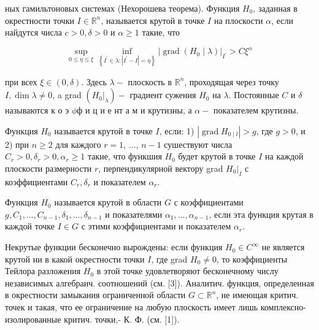 \documentclass[10pt]{article}
\begin{document}
ных гамильтоновых системах (Нехорошева теорема). Функция $H_{0}$, заданная в окрестности точки $I \in \mathbb{R}^{n}$, называется крутой в точке $I$ на плоскости $\alpha$, если найдутся числа $c>0, \delta>0$ и $\alpha \geqslant 1$ такие, что



\[

\sup _{0 \leqslant \eta \leqslant \xi} \inf _{\left\{I^{\prime} \in \lambda:\left|I^{\prime}-I\right|=\eta\right\}}\left|\operatorname{grad}\left(H_{0} \mid \lambda\right)\right|_{I^{\prime}}>C \xi^{\alpha}

\]



при всех $\xi \in(0, \delta)$. Здесь $\lambda-$ плоскость в $\mathbb{R}^{n}$, проходящая через точку $I, \operatorname{dim} \lambda \neq 0$, a grad $\left(\left.H_{0}\right|_{\lambda}\right)-$ градиент сужения $H_{0}$ на $\lambda$. Постоянные $C$ и $\delta$ называются к о э $\phi ф$ и ц и е нт а м и крутизны, а $\alpha-$ показателем крутизны.



Функция $H_{0}$ называется крутой в точке $I$, если: 1) $\left|\operatorname{grad} H_{0 \mid l}\right|>g$, где $g>0$, и 2) при $n \geqslant 2$ для каждого $r=1$, ..., $n-1$ сушествуют числа $C_{r}>0, \delta_{r}>0, \alpha_{r} \geqslant 1$ такие, что функшия $H_{0}$ будет крутой в точке $I$ на каждой плоскости размерности $r$, перпендикулярной вектору grad $\left.H_{0}\right|_{I}$ с коэффициентами $C_{r}, \delta_{r}$ и показателем $\alpha_{r}$.



Функция $H_{0}$ называется крутой в области $G$ с коэффициентами $g, C_{1}, \ldots, C_{n-1}, \delta_{1}, \ldots, \delta_{n-1}$ и показателями $\alpha_{1}, \ldots, \alpha_{n-1}$, если эта функция крутая в каждой точке $I \in G$ с этими коэффициентами и показателем $\alpha_{r}$.



Некрутые функции бесконечно вырождены: если функция $H_{0} \in C^{\infty}$ не является крутой ни в какой окрестности точки $I$, где grad $H_{0} \neq 0$, то коэффициенты Тейлора разложения $H_{0}$ в этой точке удовлетворяют бесконечному числу независимых алгебраич. соотношений (см. [3]). Аналитич. функция, определенная в окрестности замыкания ограниченной области $G \subset \mathbb{R}^{n}$, не имеющая критич. точек и такая, что ее ограничение на любую плоскость имеет лишь комплексно-изолированные критич. точки,- К. Ф. (см. [1]).
\end{document}
